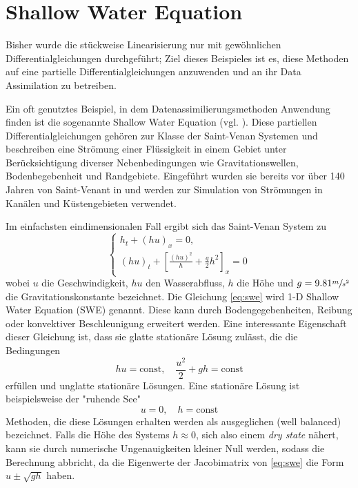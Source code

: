 \section{Shallow Water Equation}
Bisher wurde die stückweise Linearisierung nur mit gewöhnlichen Differentialgleichungen durchgeführt; Ziel dieses Beispieles ist es, diese Methoden auf eine partielle Differentialgleichungen anzuwenden und an ihr Data Assimilation zu betreiben.

Ein oft genutztes Beispiel, in dem Datenassimilierungsmethoden Anwendung finden ist die sogenannte Shallow Water Equation (vgl. \cite{zou,navon}). 
Diese partiellen Differentialgleichungen gehören zur Klasse der Saint-Venan Systemen und beschreiben eine Strömung einer Flüssigkeit in einem Gebiet unter Berücksichtigung diverser Nebenbedingungen wie Gravitationswellen, Bodenbegebenheit und Randgebiete. Eingeführt wurden sie bereits vor über 140 Jahren von Saint-Venant in \cite{saint1871theorie} und werden zur Simulation von Strömungen in Kanälen und Küstengebieten verwendet.

Im einfachsten eindimensionalen Fall ergibt sich das Saint-Venan System zu 
\begin{equation}
\begin{cases}
 h_t + (hu)_x = 0,\\
 (hu)_t + \left[\frac{(hu)^2}{h} + \frac{g}{2}h^2\right]_x = 0
\end{cases} 
\label{eq:swe}
\end{equation}
wobei $u$ die Geschwindigkeit, $hu$ den Wasserabfluss, $h$ die Höhe und $g=9.81 \sfrac{m}{s^2}$ die Gravitationskonstante bezeichnet.
Die Gleichung \eqref{eq:swe} wird 1-D Shallow Water Equation (SWE) genannt.
Diese kann durch Bodengegebenheiten, Reibung oder konvektiver Beschleunigung erweitert werden.
Eine interessante Eigenschaft dieser Gleichung ist, dass sie glatte stationäre Lösung zulässt, die die Bedingungen
\[
 hu = \text{const}, \quad \frac{u^2}{2}+gh = \text{const}
\]
erfüllen und unglatte stationäre Lösungen. Eine stationäre Lösung ist beispielsweise der "ruhende See"
\[
 u=0, \quad h=\text{const}
\]
Methoden, die diese Lösungen erhalten werden als ausgeglichen (well balanced) bezeichnet. Falls die Höhe des Systems $h \approx 0 $, sich also einem \textit{dry state} nähert, kann sie durch numerische Ungenauigkeiten kleiner Null werden, sodass die Berechnung abbricht, da die Eigenwerte der Jacobimatrix von \eqref{eq:swe} die Form $u\pm \sqrt{gh}$ haben.

